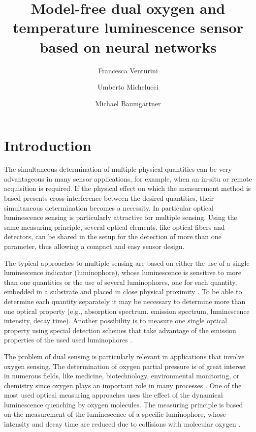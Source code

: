 \documentclass[9pt,twocolumn,twoside,pdftex]{optica}
\title{Model-free dual oxygen and temperature luminescence sensor based on neural networks}
\author[1,2,*]{Francesca Venturini}
\author[2]{Umberto Michelucci}
\author[1]{Michael Baumgartner}
\affil[1]{Institute of Applied Mathematics and Physics, Zurich University of Applied Sciences,
Technikumstrasse 9, 8401 Winterthur, Switzerland}
\affil[2]{TOELT LLC; Birchlenstr. 25, 8600 Dübendorf, Switzerland}
\affil[*]{Corresponding author: francesca.venturini@zhaw.ch}
\begin{document}
\maketitle

\section{Introduction}

The simultaneous determination of multiple physical quantities can be very advantageous in many sensor applications, for example, when an in-situ or remote acquisition is required. 
If the physical effect on which the measurement method is based presents cross-interference between the desired quantities, their simultaneous determination becomes a necessity.
In particular optical luminescence sensing is particularly attractive for multiple sensing. Using the same measuring principle, several optical elements, like optical fibers and detectors, can be shared in the setup for the detection of more than one parameter, thus allowing a compact and easy sensor design.

The typical approaches to multiple sensing are based on either the use of a single luminescence indicator (luminophore), whose luminescence is sensitive to more than one quantities or the use of several luminophores, one for each quantity, embedded in a substrate and placed in close physical proximity \cite{Stich2010,Borisov2011novel,Kameya2014,Wang2014,Santoro2016,Biring2019}. To be able to determine each quantity separately it may be necessary to determine more than one optical property (e.g., absorption spectrum, emission spectrum, luminescence intensity, decay time). Another possibility is to measure one single optical property using special detection schemes that take advantage of the emission properties of the used used luminophores \cite{Collier2013,Wang2014,Stehning2004,Jorge2008,Biring2019,Moore2006}. 

The problem of dual sensing is particularly relevant in applications that involve oxygen sensing. The determination of oxygen partial pressure is of great interest in numerous fields, like medicine, biotechnology, environmental monitoring, or chemistry since oxygen plays an important role in many processes \cite{Papkovsky2013,Wang2014}. One of the most used optical measuring approaches uses the effect of the dynamical luminescence quenching by oxygen molecules. The measuring principle is based on the measurement of the luminescence of a specific luminophore, whose intensity and decay time are reduced due to collisions with molecular oxygen \cite{Lakowicz2006}.
\end{document}
